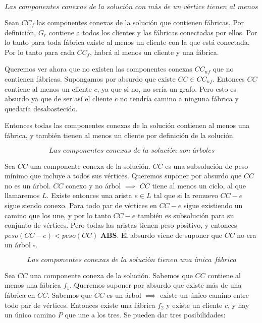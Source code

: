 \documentclass[a4paper]{report}
\begin{document}
\begin{equation}
    \textit{Las componentes conexas de la solución con más de un vértice tienen al menos un cliente y una fábrica}
\end{equation}

Sean $CC_f$ las componentes conexas de la solución que contienen fábricas.
Por definición, $G_r$ contiene a todos los clientes y las fábricas conectadas por ellos.
Por lo tanto para toda fábrica existe al menos un cliente con la que está conectada.
Por lo tanto para cada $CC_f$, habrá al menos un cliente y una fábrica.

Queremos ver ahora que no existen las componentes conexas $CC_{nf}$ que no contienen fábricas.
Supongamos por absurdo que existe $CC \in CC_{nf}$.
Entonces $CC$ contiene al menos un cliente $c$, ya que si no, no sería un grafo.
Pero esto es absurdo ya que de ser así el cliente $c$ no tendría camino a ninguna fábrica y quedaría desabastecido.

Entonces todas las componentes conexas de la solución contienen al menos una fábrica, y también tienen al menos un cliente por definición de la solución.

\begin{equation} 
    \textit{Las componentes conexas de la solución son árboles}
\end{equation}

Sea $CC$ una componente conexa de la solución. $CC$ es una subsolución de peso mínimo que incluye a todos sus vértices.
Queremos suponer por absurdo que $CC$ no es un árbol.
$CC$ conexo y no árbol $\implies$ $CC$ tiene al menos un ciclo, al que llamaremos $L$.
Existe entonces una arista $e \in L$ tal que si la remuevo $CC - e$ sigue siendo conexo.
Para todo par de vértices en $CC - e$ sigue existiendo un camino que los une, y por lo tanto $CC - e$ también es subsolución para su conjunto de vértices.
Pero todas las aristas tienen peso positivo, y entonces $peso(CC - e) < peso(CC)$ \textbf{ABS}.
El absurdo viene de suponer que $CC$ no era un árbol $\square$.

\begin{equation}
    \textit{Las componentes conexas de la solución tienen una única fábrica}
\end{equation}

Sea $CC$ una componente conexa de la solución.
Sabemos que $CC$ contiene al menos una fábrica $f_1$.
Queremos suponer por absurdo que existe más de una fábrica en $CC$.
Sabemos que $CC$ es un árbol $\implies$ existe un único camino entre todo par de vértices.
Entonces existe una fábrica $f_2$ y existe un cliente $c$, y hay un único camino $P$ que une a los tres.
Se pueden dar tres posibilidades:
\end{document}
